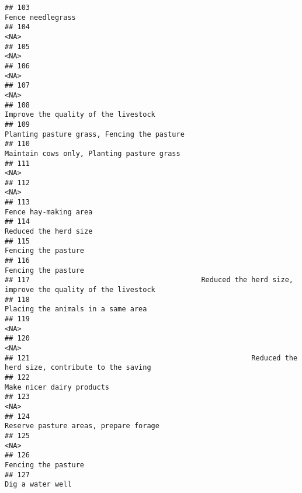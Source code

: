 \documentclass[
]{article}
\begin{document}
\begin{verbatim}
## 103                                                                                   Fence needlegrass
## 104                                                                                                <NA>
## 105                                                                                                <NA>
## 106                                                                                                <NA>
## 107                                                                                                <NA>
## 108                                                                Improve the quality of the livestock
## 109                                                         Planting pasture grass, Fencing the pasture
## 110                                                          Maintain cows only, Planting pasture grass
## 111                                                                                                <NA>
## 112                                                                                                <NA>
## 113                                                                               Fence hay-making area
## 114                                                                               Reduced the herd size
## 115                                                                                 Fencing the pasture
## 116                                                                                 Fencing the pasture
## 117                                         Reduced the herd size, improve the quality of the livestock
## 118                                                                  Placing the animals in a same area
## 119                                                                                                <NA>
## 120                                                                                                <NA>
## 121                                                     Reduced the herd size, contribute to the saving
## 122                                                                           Make nicer dairy products
## 123                                                                                                <NA>
## 124                                                               Reserve pasture areas, prepare forage
## 125                                                                                                <NA>
## 126                                                                                 Fencing the pasture
## 127                                                                                    Dig a water well

\end{verbatim}
\end{document}
